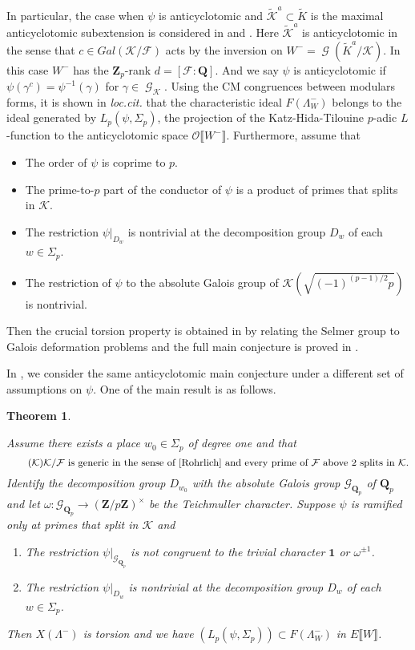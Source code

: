 \documentclass[leqno]{amsart}
\newtheorem{thm}{Theorem}[section]
\theoremstyle{definition}
\theoremstyle{remark}
\newcommand{\id}{\mathbf{1}}
\newcommand{\oo}{\mathcal{O}}
\newcommand{\Q}{{\mathbf{Q}}}
\newcommand{\Z}{{\mathbf{Z}}}
\newcommand{\Qp}{\mathbf{Q}_p}
\newcommand{\Zp}{\mathbf{Z}_p}
\DeclareMathOperator{\Gal}{\mathcal{G}}
\newcommand{\Gp}{\mathcal{G}_{\Qp}} %
\newcommand{\F}{{\mathcal{F}}} %
\newcommand{\K}{{\mathcal{K}}} %
\begin{document}
In particular, the case when 
$\psi$ is anticyclotomic and
$\widetilde{\K}^a\subset \widetilde{K}$ is the maximal 
anticyclotomic subextension is considered
in \cite{HT93} and \cite{HT94}.
Here $\widetilde{\K}^a$ is anticyclotomic in the sense that 
$c\in Gal(\K/\F)$ acts by the inversion on $W^-=\Gal(\widetilde{K}^a/\K)$.
In this case $W^-$ has the $\Zp$-rank $d=[\F:\Q]$.
And we say $\psi$ is anticyclotomic if 
$\psi(\gamma^c)=\psi^{-1}(\gamma)$ for $\gamma\in\Gal_\K$.
Using the CM congruences between modulars forms,
it is shown in \textit{loc.cit.}
that the characteristic ideal $F(\Lambda_{W}^-)$
belongs to the ideal generated by $L_p(\psi,\Sigma_p)$,
the projection of the Katz-Hida-Tilouine $p$-adic $L$-function
to the anticyclotomic space $\oo\llbracket W^-\rrbracket$.
Furthermore, assume that
\begin{itemize}
    \item The order of $\psi$ is coprime to $p$.
    \item The prime-to-$p$ part of the conductor of $\psi$
    is a product of primes that splits in $\K$.
    \item The restriction $\psi\vert_{D_w}$ is nontrivial
    at the decomposition group $D_w$ of each $w\in\Sigma_p$.
    \item The restriction of $\psi$ to 
    the absolute Galois group of $\K(\sqrt{(-1)^{(p-1)/2}p})$
    is nontrivial.
\end{itemize}
Then the crucial torsion property is obtained in
\cite[Thm.5.33]{Hida06b} by relating the Selmer group to 
Galois deformation problems
and the full main conjecture 
is proved in \cite{Hida06}.

In \cite{lee2}, we consider the same anticyclotomic main conjecture under
a different set of assumptions on $\psi$.
One of the main result is as follows.

\begin{thm}\label{thm:main}

Assume there exists a place $w_0\in\Sigma_p$ of degree one and that
\begin{equation}\label{cond:K2in}\tag{$\K$}
\K/\F \text{ is generic in the sense of \cite{Rohrlich}
and every prime of $\F$ above $2$ splits in $\K$}.
\end{equation}
Identify the decomposition group $D_{w_0}$
with the absolute Galois group $\Gp$ of $\Qp$
and let $\omega\colon \Gp\to (\Z/p\Z)^\times$ be the Teichmuller character.
Suppose $\psi$ is ramified only at primes that split in $\K$ and
\begin{enumerate}[label=($\psi$\arabic*)]
\item  The restriction $\psi\vert_{\Gp}$ is not congruent
to the trivial character $\id$ or $\omega^{\pm1}$.
\label{cond:psi1in}
\item The restriction $\psi\vert_{D_w}$ is nontrivial
at the decomposition group $D_w$ of each $w\in\Sigma_p$.
\label{cond:psi2in}
\end{enumerate}
Then $X(\Lambda^-)$ is torsion
and we have $(L_p(\psi,\Sigma_p))\subset F(\Lambda_W^-)$
in $E\llbracket W\rrbracket$.

\end{thm}
\end{document}
